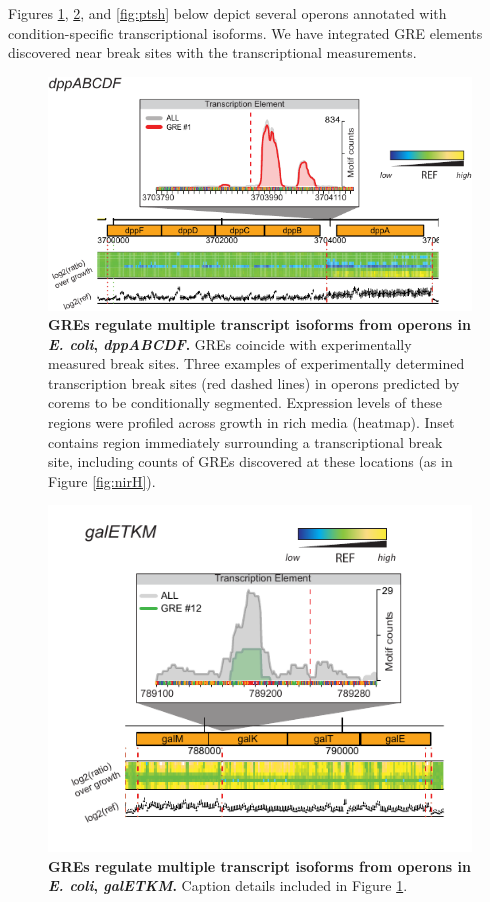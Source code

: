 Figures \ref{fig:dpp_ecoli_expression}, \ref{fig:galE}, and
\ref{fig:ptsh} below depict several operons annotated with
condition-specific transcriptional isoforms. We have integrated GRE
elements discovered near break sites with the transcriptional
measurements.

\begin{figure}[hp]
\centering
\includegraphics[width=0.8\linewidth]{figures/dpp_ecoli_expression.pdf}
\caption[GREs regulate multiple transcript isoforms from operons in
  {\it E. coli}, \textit{dppABCDF}]{\textbf{GREs regulate multiple
    transcript isoforms from operons in {\it E. coli},
    \textit{dppABCDF}.} GREs coincide with experimentally measured
  break sites. Three examples of experimentally determined
  transcription break sites (red dashed lines) in operons predicted by
  corems to be conditionally segmented. Expression levels of these
  regions were profiled across growth in rich media (heatmap). Inset
  contains region immediately surrounding a transcriptional break
  site, including counts of GREs discovered at these locations (as in
  Figure \ref{fig:nirH}).}
\label{fig:dpp_ecoli_expression}
\end{figure}

\begin{figure}[hp]
\centering
\includegraphics[width=0.8\linewidth]{figures/galE.pdf}
\caption[GREs regulate multiple transcript isoforms from operons in
  {\it E. coli}, \textit{galETKM}]{\textbf{GREs regulate multiple
    transcript isoforms from operons in {\it E. coli},
    \textit{galETKM}.} Caption details included in Figure
  \ref{fig:dpp_ecoli_expression}.}
\label{fig:galE}
\end{figure}

